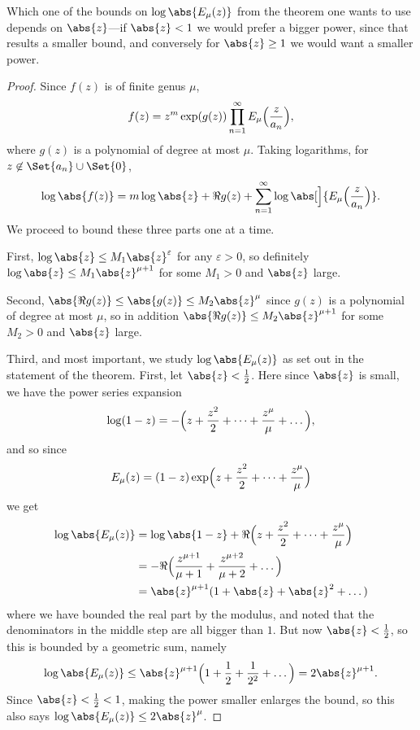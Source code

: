 \begin{remark}
	Which one of the bounds on $\log \abs{E_\mu(z)}$ from the theorem one wants to use depends on $\abs{z}$---if $\abs{z} < 1$ we would prefer a bigger power, since that results a smaller bound, and conversely for $\abs{z} \geq 1$ we would want a smaller power.
\end{remark}


\begin{proof}
	Since $f(z)$ is of finite genus $\mu$,
	\[
		f(z) = z^m \exp(g(z)) \prod_{n = 1}^\infty E_\mu\Bigl( \frac{z}{a_n} \Bigr),
	\]
	where $g(z)$ is a polynomial of degree at most $\mu$.
	Taking logarithms, for $z \not\in \Set{a_n} \cup \Set{0}$,
	\[
		\log \abs{f(z)} = m \log \abs{z} + \Re g(z) + \sum_{n = 1}^\infty \log \abs[\Big]{E_\mu \Bigl( \frac{z}{a_n} \Bigr)}.
	\]
	We proceed to bound these three parts one at a time.

	First, $\log \abs{z} \leq M_1 \abs{z}^{\varepsilon}$ for any $\varepsilon > 0$, so definitely $\log \abs{z} \leq M_1 \abs{z}^{\mu + 1}$ for some $M_1 > 0$ and $\abs{z}$ large.

	Second, $\abs{\Re g(z)} \leq \abs{g(z)} \leq M_2 \abs{z}^\mu$ since $g(z)$ is a polynomial of degree at most $\mu$, so in addition $\abs{\Re g(z)} \leq M_2 \abs{z}^{\mu + 1}$ for some $M_2 > 0$ and $\abs{z}$ large.

	Third, and most important, we study $\log \abs{E_\mu(z)}$ as set out in the statement of the theorem.
	First, let $\abs{z} < \frac{1}{2}$.
	Here since $\abs{z}$ is small, we have the power series expansion
	\[
		\log(1 - z) = - \Bigl( z + \frac{z^2}{2} + \dots + \frac{z^\mu}{\mu} + \dots \Bigr),
	\]
	and so since
	\[
		E_\mu(z) = (1 - z) \exp\Bigl( z + \frac{z^2}{2} + \dots + \frac{z^\mu}{\mu} \Bigr)
	\]
	we get
	\begin{align*}
		\log \abs{E_\mu(z)} &= \log\abs{1 - z} + \Re\Bigl( z + \frac{z^2}{2} + \dots + \frac{z^\mu}{\mu}\Bigr) \\
		&= -\Re\Bigl( \frac{z^{\mu + 1}}{\mu + 1} + \frac{z^{\mu + 2}}{\mu + 2} + \dots \Bigr) \\
		&= \abs{z}^{\mu + 1} ( 1 + \abs{z} + \abs{z}^2 + \dots )
	\end{align*}
	where we have bounded the real part by the modulus, and noted that the denominators in the middle step are all bigger than $1$.
	But now $\abs{z} < \frac{1}{2}$, so this is bounded by a geometric sum, namely
	\[
		\log \abs{E_\mu(z)} \leq \abs{z}^{\mu + 1} \Bigl( 1 + \frac{1}{2} + \frac{1}{2^2} + \dots \Bigr) = 2 \abs{z}^{\mu + 1}.
	\]
	Since $\abs{z} < \frac{1}{2} < 1$, making the power smaller enlarges the bound, so this also says $\log\abs{E_\mu(z)} \leq 2 \abs{z}^\mu$.


\end{proof}
